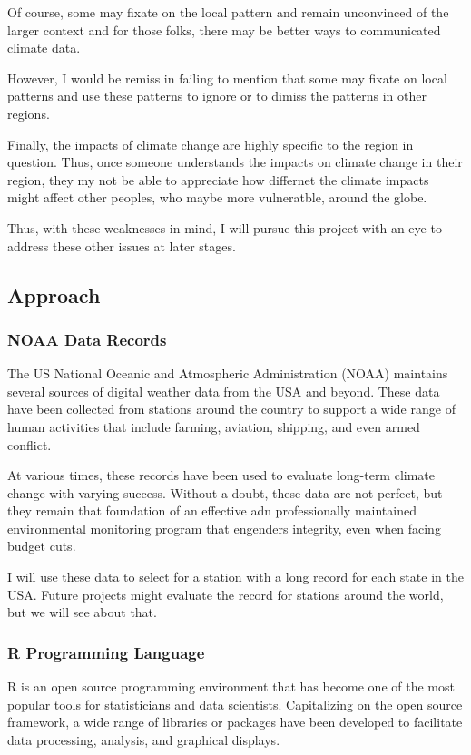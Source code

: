 \documentclass{article}\usepackage[]{graphicx}\usepackage[dvipsnames]{xcolor}
\begin{document}
Of course, some may fixate on the local pattern and remain unconvinced of the larger context and for those folks, there may be better ways to communicated climate data. 

However, I would be remiss in failing to mention that some may fixate on local patterns and use these patterns to ignore or to dimiss the patterns in other regions. 

Finally, the impacts of climate change are highly specific to the region in question. Thus, once someone understands the impacts on climate change in their region, they my not be able to appreciate how differnet the climate impacts might affect other peoples, who maybe more vulneratble, around the globe. 

Thus, with these weaknesses in mind, I will pursue this project with an eye to address these other issues at later stages.

\subsection{Approach}

\subsubsection{NOAA Data Records}

The US National Oceanic and Atmospheric Administration (NOAA) maintains several sources of digital weather data from the USA and beyond. These data have been collected from stations around the country to support a wide range of human activities that include farming, aviation, shipping, and even armed conflict. 

At various times, these records have been used to evaluate long-term climate change with varying success. Without a doubt, these data are not perfect, but they remain that foundation of an effective adn professionally maintained environmental monitoring program that engenders integrity, even when facing budget cuts. 

I will use these data to select for a station with a long record for each state in the USA. Future projects might evaluate the record for stations around the world, but we will see about that. 

\subsubsection{R Programming Language}

R is an open source programming environment that has become one of the most popular tools for statisticians and data scientists. Capitalizing on the open source framework, a wide range of libraries or packages have been developed to facilitate data processing, analysis, and graphical displays. 
\end{document}
